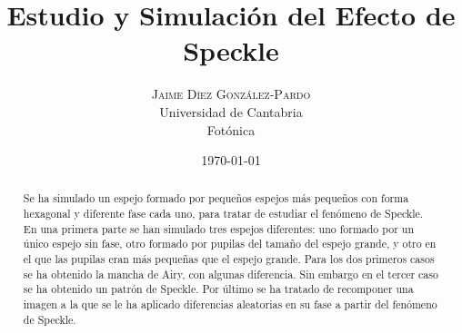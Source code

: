 \documentclass[twoside]{article}
\title{
	\vspace{-15mm}
	\fontsize{28pt}{10pt}
	\selectfont\textbf{Estudio y Simulación del Efecto de Speckle}%
}
\author{
	\large
	\textsc{Jaime D\'iez Gonz\'alez-Pardo}\\[4mm]
	\fontsize{28pt}{10pt} Universidad de Cantabria \\ %
	\normalsize Fotónica \\ 
}
\date{ \today }
\begin{document}
	\maketitle %


	\thispagestyle{fancy} %


	\begin{abstract}

		\noindent%

			Se ha simulado un espejo formado por pequeños espejos más pequeños con forma hexagonal y diferente fase cada uno, para tratar de estudiar el fenómeno de Speckle. En una primera parte se han simulado tres espejos diferentes: uno formado por un único espejo sin fase, otro formado por pupilas del tamaño del espejo grande, y otro en el que las pupilas eran más pequeñas que el espejo grande. Para los dos  primeros casos se ha obtenido la mancha de Airy, con algunas diferencia. Sin embargo en el tercer caso se ha obtenido un patrón de Speckle. Por último se ha tratado de recomponer una imagen a la que se le ha aplicado diferencias aleatorias en su fase a partir del fenómeno de Speckle.

	\end{abstract}

\end{document}
